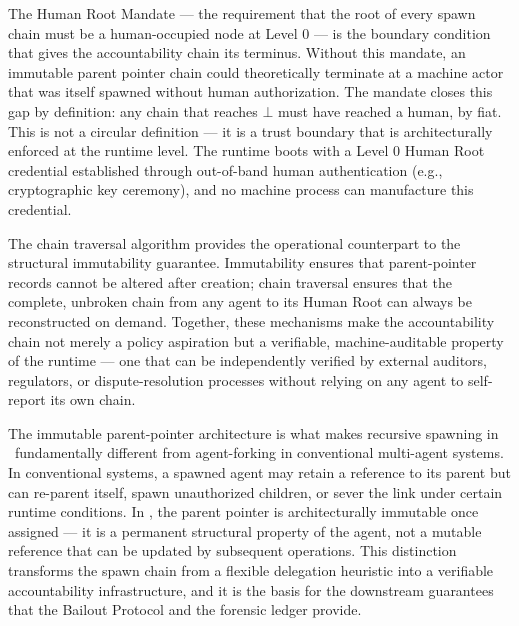 The Human Root Mandate — the requirement that the root of every spawn chain must be a human-occupied node at Level 0 — is the boundary condition that gives the accountability chain its terminus. Without this mandate, an immutable parent pointer chain could theoretically terminate at a machine actor that was itself spawned without human authorization. The mandate closes this gap by definition: any chain that reaches $\bot$ must have reached a human, by fiat. This is not a circular definition — it is a trust boundary that is architecturally enforced at the runtime level. The runtime boots with a Level 0 Human Root credential established through out-of-band human authentication (e.g., cryptographic key ceremony), and no machine process can manufacture this credential.

The chain traversal algorithm provides the operational counterpart to the structural immutability guarantee. Immutability ensures that parent-pointer records cannot be altered after creation; chain traversal ensures that the complete, unbroken chain from any agent to its Human Root can always be reconstructed on demand. Together, these mechanisms make the accountability chain not merely a policy aspiration but a verifiable, machine-auditable property of the runtime — one that can be independently verified by external auditors, regulators, or dispute-resolution processes without relying on any agent to self-report its own chain.

The immutable parent-pointer architecture is what makes recursive spawning in \bxthree\ fundamentally different from agent-forking in conventional multi-agent systems. In conventional systems, a spawned agent may retain a reference to its parent but can re-parent itself, spawn unauthorized children, or sever the link under certain runtime conditions. In \bxthree, the parent pointer is architecturally immutable once assigned — it is a permanent structural property of the agent, not a mutable reference that can be updated by subsequent operations. This distinction transforms the spawn chain from a flexible delegation heuristic into a verifiable accountability infrastructure, and it is the basis for the downstream guarantees that the Bailout Protocol and the forensic ledger provide.